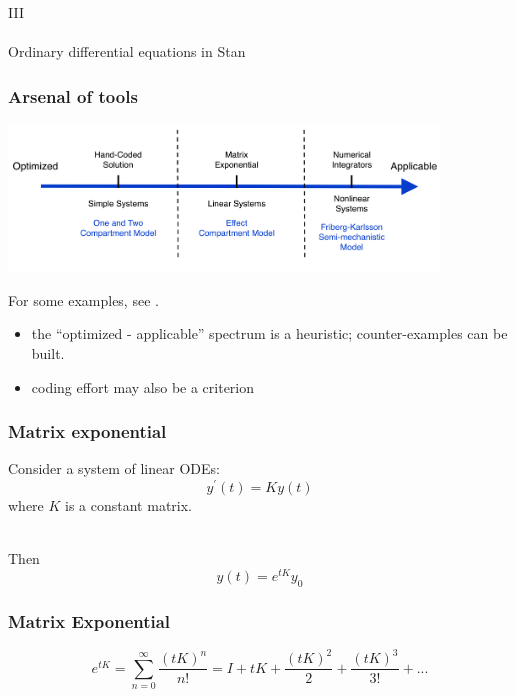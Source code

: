 \documentclass[xcolor=table]{beamer}
\begin{document}
 

\begin{frame}
  \begin{center}
    {\Large III} \\ \ \\ Ordinary differential equations in Stan
  \end{center}
\end{frame}

\begin{frame}
  \frametitle{Arsenal of tools}

  \begin{center}
    \includegraphics[width=4.5in]{../figures/odeSolvers.png}
  \end{center}

  For some examples, see \cite{Margossian:2017}.

\end{frame}

\begin{frame}

  \begin{itemize}
    \item the ``optimized - applicable'' spectrum is a heuristic; counter-examples can be built.
    \item coding effort may also be a criterion
  \end{itemize}

\end{frame}

\begin{frame}
  \frametitle{Matrix exponential}
  
  Consider a system of linear ODEs:
  $$ y^\prime(t) = Ky(t) $$
  where $K$ is a constant matrix.
  
  \ \\ Then
    $$ y(t) = e^{tK} y_0 $$

\end{frame}

\begin{frame}
  \frametitle{Matrix Exponential}
  
  $$ e^{tK} = \sum_{n=0}^{\infty} \dfrac{(tK)^n}{n!} = I + tK + \frac{(tK)^2}{2} + \frac{(tK)^3}{3!} + ... $$

\end{frame}
\end{document}
